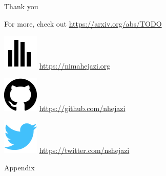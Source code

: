 \documentclass{beamer}
\begin{document}

\begin{frame}[c]{Thank you}

For more, check out \url{https://arxiv.org/abs/TODO}

\vspace{2mm}
\includegraphics[scale=0.14]{homepage.png} \url{https://nimahejazi.org}

\vspace{2mm}
\includegraphics[scale=0.11]{github-icon.png}
  \url{https://github.com/nhejazi}

\vspace{2mm}
\includegraphics[scale=0.14]{twitter-icon.png}
  \url{https://twitter.com/nshejazi}

\end{frame}


\appendix
\begin{frame}[standout]
  Appendix
\end{frame}

\end{document}

